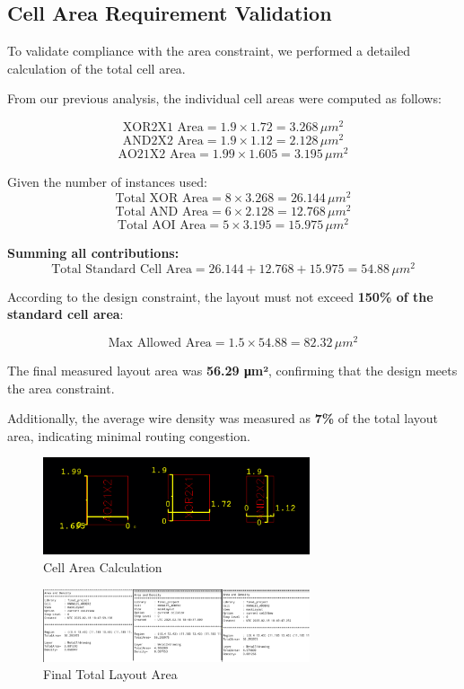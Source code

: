 \documentclass[a4paper,12pt]{article}
\begin{document}
\subsection{Cell Area Requirement Validation}

To validate compliance with the area constraint, we performed a detailed calculation of the total cell area.

From our previous analysis, the individual cell areas were computed as follows:

\[
\text{XOR2X1 Area} = 1.9 \times 1.72 = 3.268 \, \mu m^2
\]
\[
\text{AND2X2 Area} = 1.9 \times 1.12 = 2.128 \, \mu m^2
\]
\[
\text{AO21X2 Area} = 1.99 \times 1.605 = 3.195 \, \mu m^2
\]

Given the number of instances used:
\[
\text{Total XOR Area} = 8 \times 3.268 = 26.144 \, \mu m^2
\]
\[
\text{Total AND Area} = 6 \times 2.128 = 12.768 \, \mu m^2
\]
\[
\text{Total AOI Area} = 5 \times 3.195 = 15.975 \, \mu m^2
\]

\textbf{Summing all contributions:}
\[
\text{Total Standard Cell Area} = 26.144 + 12.768 + 15.975 = 54.88 \, \mu m^2
\]

According to the design constraint, the layout must not exceed \textbf{150\% of the standard cell area}:

\[
\text{Max Allowed Area} = 1.5 \times 54.88 = 82.32 \, \mu m^2
\]

The final measured layout area was \textbf{56.29 μm²}, confirming that the design meets the area constraint.

Additionally, the average wire density was measured as \textbf{7\%} of the total layout area, indicating minimal routing congestion.

\begin{figure}[H]
    \centering
    \includegraphics[width=0.7\textwidth]{images/cells_area.png}
    \caption{Cell Area Calculation}
\end{figure}

\begin{figure}[H]
    \centering
    \includegraphics[width=0.7\textwidth]{images/total_area.png}
    \caption{Final Total Layout Area}
\end{figure}
\end{document}
